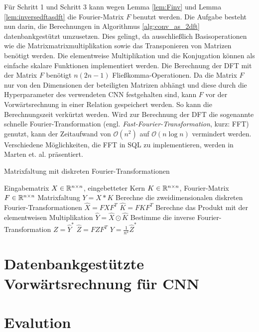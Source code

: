 Für Schritt 1 und Schritt 3 kann wegen Lemma \ref{lem:Finv} und Lemma \ref{lem:inversedftasdft} die Fourier-Matrix $F$ benutzt werden. Die Aufgabe besteht nun darin, die Berechnungen in Algorithmus \ref{alg:conv_as_2dft} datenbankgestützt umzusetzen. Dies gelingt, da ausschließlich Basisoperationen wie die Matrixmatrixmultiplikation sowie das Transponieren von Matrizen benötigt werden. Die elementweise Multiplikation und die Konjugation können als einfache skalare Funktionen implementiert werden. Die Berechnung der DFT mit der Matrix $F$ benötigt $n(2n-1)$ Fließkomma-Operationen. Da die Matrix $F$ nur von den Dimensionen der beteiligten Matrizen abhängt und diese durch die Hyperparameter des verwendeten CNN festgehalten sind, kann $F$ vor der Vorwärtsrechnung in einer Relation gespeichert werden. So kann die Berechnungszeit verkürtzt werden. Wird zur Berechnung der DFT die sogenannte schnelle Fourier-Transformation (engl. \textit{Fast-Fourier-Transformation}, kurz: FFT) genutzt, kann der Zeitaufwand von $\mathcal{O}(n^2)$ auf $\mathcal{O}(n \log n)$ vermindert werden. Verschiedene Möglichkeiten, die FFT in SQL zu implementieren, werden in Marten et. al.\cite{DBLP:conf/adbis/Marten0019} präsentiert.

\begin{algorithm}[h]
    \caption{Matrixfaltung mit diskreten Fourier-Transformationen}
    \label{alg:conv_as_2dft}
    \begin{algorithmic}
    \Require  Eingabematrix $X \in \mathbb{R}^{n \times n}$, eingebetteter Kern $K \in \mathbb{R}^{n \times n}$, Fourier-Matrix $F \in \mathbb{R}^{n \times n}$ 
    \Ensure Matrixfaltung $Y= X \ast K$
    \State Berechne die zweidimensionalen diskreten Fourier-Transformationen
    \State $\hat{X}=F X F^T$
    \State $\hat{K}=F K F^T$ 
    \State Berechne das Produkt mit der elementweisen Multiplikation
    \State $\hat{Y}= \hat{X} \odot \hat{K}$
    \State Bestimme die inverse Fourier-Transformation  
    \State $Z=\hat{Y}^*$
    \State $\hat{Z}=F Z F^T$
    \State $Y=\frac{1}{n^2}\hat{Z}^*$
    \end{algorithmic}
\end{algorithm}

\section{Datenbankgestützte Vorwärtsrechnung für CNN}
\label{abs_CNN_in_SQL}
\section{Evalution}
\label{abs:CNN_eval}
